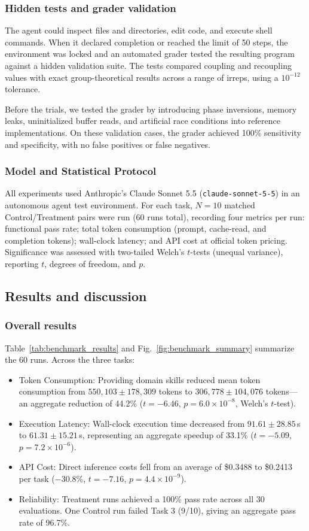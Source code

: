 \documentclass[aps,onecolumn,10pt,superscriptaddress,floatfix,nofootinbib]{revtex4}
\begin{document}
\subsubsection{Hidden tests and grader validation}
The agent could inspect files and directories, edit code, and execute shell
commands. When it declared completion or reached the limit of 50 steps, the
environment was locked and an automated grader tested the resulting program
against a hidden validation suite. The tests compared coupling and recoupling
values with exact group-theoretical results across a range of irreps, using a
$10^{-12}$ tolerance.

Before the trials, we tested the grader by introducing phase inversions,
memory leaks, uninitialized buffer reads, and artificial race conditions into
reference implementations. On these validation cases, the grader achieved
100\% sensitivity and specificity, with no false positives or false negatives.

\subsubsection{Model and Statistical Protocol}
All experiments used Anthropic's Claude Sonnet 5.5 (\texttt{claude-sonnet-5-5}) in an autonomous agent
test environment. For each task, $N = 10$ matched Control/Treatment pairs were run (60
runs total), recording four metrics per run: functional pass rate; total
token consumption (prompt, cache-read, and completion tokens); wall-clock
latency; and API cost at official token pricing. Significance was assessed with
two-tailed Welch's $t$-tests (unequal variance), reporting $t$, degrees of
freedom, and $p$.

\subsection{Results and discussion}

\subsubsection{Overall results}
Table~\ref{tab:benchmark_results} and Fig.~\ref{fig:benchmark_summary} summarize
the 60 runs. Across the three tasks:
\begin{itemize}
    \item {Token Consumption:} Providing domain skills reduced mean token consumption from $550,103 \pm 178,309$ tokens to $306,778 \pm 104,076$ tokens---an aggregate reduction of {44.2\%} ($t = -6.46$, $p = 6.0 \times 10^{-8}$, Welch's $t$-test).
    \item {Execution Latency:} Wall-clock execution time decreased from $91.61 \pm 28.85$\,s to $61.31 \pm 15.21$\,s, representing an aggregate speedup of {33.1\%} ($t = -5.09$, $p = 7.2 \times 10^{-6}$).
    \item {API Cost:} Direct inference costs fell from an average of \$0.3488 to \$0.2413 per task ({$-$30.8\%}, $t = -7.16$, $p = 4.4 \times 10^{-9}$).
    \item {Reliability:} Treatment runs achieved a 100\% pass rate across all 30 evaluations. One Control run failed Task 3 (9/10), giving an aggregate pass rate of 96.7\%.
\end{itemize}
\end{document}
